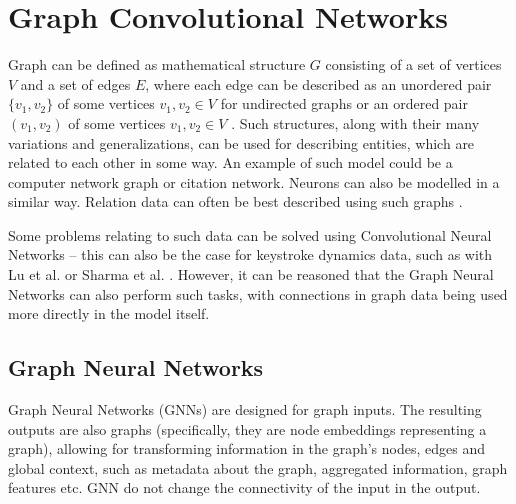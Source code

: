 
\chapter{Graph Convolutional Networks}

Graph can be defined as mathematical structure $G$ consisting of a set of vertices $V$ and a set of edges $E$, where each edge can be described as an unordered pair $\{ v_1, v_2 \}$ of some vertices $v_1, v_2 \in V$ for undirected graphs or an ordered pair $( v_1, v_2 )$ of some vertices $v_1, v_2 \in V$ \cite{wikipedia_graph_2025}. Such structures, along with their many variations and generalizations, can be used for describing entities, which are related to each other in some way. An example of such model could be a computer network graph or citation network. Neurons can also be modelled in a similar way. Relation data can often be best described using such graphs \cite{Lesk2024}.

Some problems relating to such data can be solved using Convolutional Neural Networks -- this can also be the case for keystroke dynamics data, such as with Lu et al. \cite{Lu2020} or Sharma et al. \cite{Shar2023}. However, it can be reasoned that the Graph Neural Networks can also perform such tasks, with connections in graph data being used more directly in the model itself.

\section{Graph Neural Networks}
Graph Neural Networks (GNNs) are designed for graph inputs. The resulting outputs are also graphs (specifically, they are node embeddings representing a graph), allowing for transforming information in the graph's nodes, edges and global context, such as metadata about the graph, aggregated information, graph features etc. \cite{sanch2021} GNN do not change the connectivity of the input in the output. 

